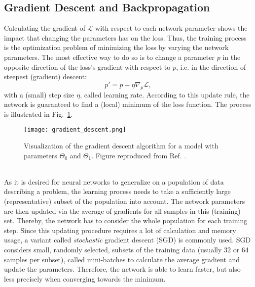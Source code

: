 \documentclass[a4paper, 12pt, twoside]{article}
\begin{document}
\newpage

\thispagestyle{noheader}
{\pagestyle{plain} \tableofcontents }
\newpage


\thispagestyle{noheader}

\newpage

\newpage

\newpage

\newpage

\newpage


\newpage

\begin{appendices}

	\section{Gradient Descent and Backpropagation}\label{app:nn_train}
Calculating the gradient of $\mathscr{L}$ with respect to each network parameter shows the impact that changing the parameters has on the loss. Thus, the training process is the optimization problem of minimizing the loss by varying the network parameters. The most effective way to do so is to change a parameter $p$ in the opposite direction of the loss's gradient with respect to $p$, i.e. in the direction of steepest (gradient) descent:
\begin{equation}
	p' = p - \eta \nabla_p\mathscr{L},
\end{equation}
with a (small) step size $\eta$, called learning rate. According to this update rule, the network is guaranteed to find a (local) minimum of the loss function. The process is illustrated in Fig.~\ref{fig:grad_desc}.\\
\begin{figure}[htp]
			\begin{center}
				\texttt{[image: gradient\_descent.png]} 
				\caption{Visualization of the gradient descent algorithm for a model with parameters $\Theta_0$ and $\Theta_1$. Figure reproduced from Ref. \cite{vlad20}.}
				\label{fig:grad_desc}
			\end{center}
\end{figure}
\\
As it is desired for neural networks to generalize on a population of data describing a problem, the learning process needs to take a sufficiently large (representative) subset of the population into account. The network parameters are then updated via the average of gradients for all samples in this (training) set. Thereby, the network has to consider the whole population for each training step. Since this updating procedure requires a lot of calculation and memory usage, a variant called \textit{stochastic} gradient descent (SGD) is commonly used. SGD considers small, randomly selected, subsets of the training data (usually 32 or 64 samples per subset), called mini-batches to calculate the average gradient and update the parameters. Therefore, the network is able to learn faster, but also less precisely when converging towards the minimum.\\

\end{appendices}
\end{document}
